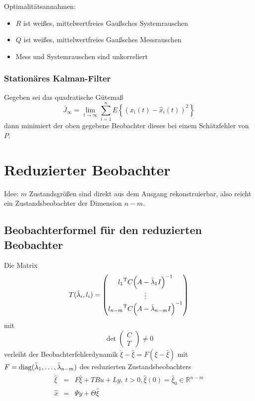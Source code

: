 Optimalitätsannahmen:
\begin{itemize}
    \item $R$ ist weißes, mittelwertfreies Gaußsches Systemrauschen
    \item $Q$ ist weißes, mittelwertfreies Gaußsches Messrauschen
    \item Mess und Systemrauschen sind unkorreliert
\end{itemize}

\subsubsection{Stationäres Kalman-Filter}
Gegeben sei das quadratische Gütemaß
\begin{equation}
    \bar{J}_\infty = \lim_{t \to \infty} \sum_{i=1}^n E\left\{ {\left(
        x_i(t) - \hat{x}_i(t)\right)}^2\right\}
\end{equation}
dann minimiert der oben gegebene Beobachter dieses bei einem Schätzfehler von $P$.

\section{Reduzierter Beobachter}
Idee: $m$ Zustandsgrößen sind direkt aus dem Ausgang rekonstruierbar, also reicht ein
Zustandsbeobachter der Dimension $n-m$.

\subsection{Beobachterformel für den reduzierten Beobachter}
Die Matrix
\begin{equation}
    T(\bar{\lambda}_i,l_i) = \begin{pmatrix}
        {l_1}^\text{T} C {\left(A-\bar{\lambda}_1 I \right)}^{-1} \\
        \vdots \\
        {l_{n-m}}^\text{T} C {\left(A-\bar{\lambda}_{n-m} I \right)}^{-1} \end{pmatrix}
\end{equation}
mit
\begin{equation}
    \det \begin{pmatrix} C \\ T \end{pmatrix} \neq 0
\end{equation}
verleiht der Beobachterfehlerdynamik $\dot{\xi}-\dot{\hat{\xi}}=F(\xi-\hat{\xi})$
mit $F=\operatorname*{diag}(\bar{\lambda}_1, \ldots, \bar{\lambda}_{n-m})$ des reduzierten
Zustandsbeobachters
\begin{eqnarray}
    \dot{\hat{\xi}} &=& F \hat{\xi} + TBu + L y,\ t>0, \hat{\xi}(0)=\hat{\xi}_0\in\mathbb{R}^{n-m} \\
    \hat{x} &=& \Psi y + \Theta \hat{\xi}
\end{eqnarray}

